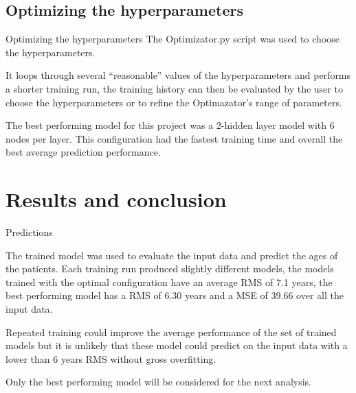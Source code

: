 \documentclass{beamer}
\begin{document}
\subsection{Optimizing the hyperparameters}
\begin{frame}{Optimizing the hyperparameters}
	The Optimizator.py script was used to choose the hyperparameters.

	It loops through several ``reasonable'' values of the hyperparameters and performs a shorter training run, the training history can then be evaluated by the user to choose the hyperparameters or to refine the Optimazator's range of parameters.

	The best performing model for this project was a 2-hidden layer model with 6 nodes per layer. This configuration had the fastest training time and overall the best average prediction performance.

\end{frame}

\section{Results and conclusion}
\begin{frame}{Predictions}

	The trained model was used to evaluate the input data and predict the ages of the patients.
Each training run produced slightly different models, the models trained with the optimal configuration have an average RMS of 7.1 years, the best performing model has a RMS of 6.30 years and a MSE of 39.66 over all the input data.

Repeated training could improve the average performance of the set of trained models but it is unlikely that these model could predict on the input data with a lower than 6 years RMS without gross overfitting. 

Only the best performing model will be considered for the next analysis.



\end{frame}

\end{document}
